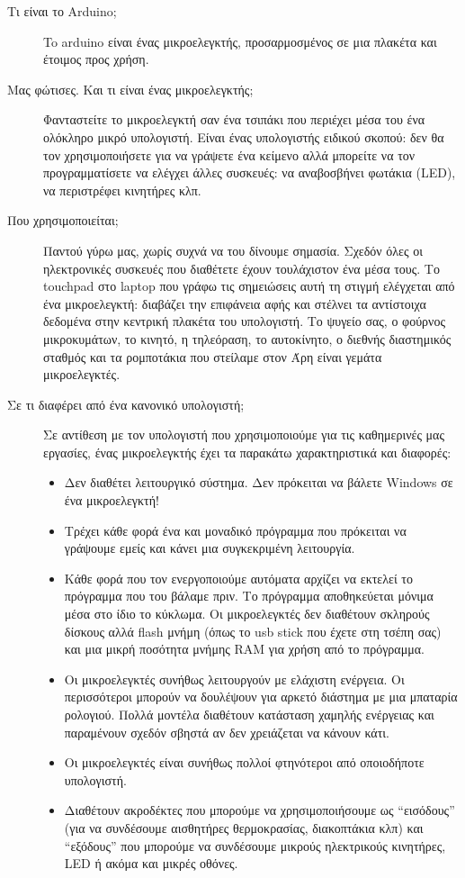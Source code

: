 \documentclass[a4paper,twoside,12pt]{article}
\begin{document}
\begin{description}

\item [Τι είναι το Arduino;]
To arduino είναι ένας μικροελεγκτής, προσαρμοσμένος σε μια πλακέτα και έτοιμος προς χρήση.
\item[Μας φώτισες. Και τι είναι ένας μικροελεγκτής;]
Φανταστείτε το μικροελεγκτή σαν ένα τσιπάκι που περιέχει μέσα του ένα ολόκληρο μικρό υπολογιστή. Είναι ένας υπολογιστής ειδικού σκοπού: δεν θα τον χρησιμοποιήσετε για να γράψετε ένα κείμενο αλλά μπορείτε να τον προγραμματίσετε να ελέγχει άλλες συσκευές: να αναβοσβήνει φωτάκια (LED), να περιστρέφει κινητήρες κλπ.
\item[Που χρησιμοποιείται;]
Παντού γύρω μας, χωρίς συχνά να του δίνουμε σημασία. Σχεδόν όλες οι ηλεκτρονικές συσκευές που διαθέτετε έχουν τουλάχιστον ένα μέσα τους. Το touchpad στο laptop που γράφω τις σημειώσεις αυτή τη στιγμή ελέγχεται από ένα μικροελεγκτή: διαβάζει την επιφάνεια αφής και στέλνει τα αντίστοιχα δεδομένα στην κεντρική πλακέτα του υπολογιστή. Το ψυγείο σας, ο φούρνος μικροκυμάτων, το κινητό, η τηλεόραση, το αυτοκίνητο, ο διεθνής διαστημικός σταθμός και τα ρομποτάκια που στείλαμε στον Άρη είναι γεμάτα μικροελεγκτές.
\item[Σε τι διαφέρει από ένα κανονικό υπολογιστή;]
Σε αντίθεση με τον υπολογιστή που χρησιμοποιούμε για τις καθημερινές μας εργασίες, ένας μικροελεγκτής έχει τα παρακάτω χαρακτηριστικά και διαφορές:
%
\begin{itemize}
\item Δεν διαθέτει λειτουργικό σύστημα. Δεν πρόκειται να βάλετε Windows σε ένα μικροελεγκτή!
\item Τρέχει κάθε φορά ένα και μοναδικό πρόγραμμα που πρόκειται να γράψουμε εμείς και κάνει μια συγκεκριμένη λειτουργία.
\item Κάθε φορά που τον ενεργοποιούμε αυτόματα αρχίζει να εκτελεί το πρόγραμμα που του βάλαμε πριν. Το πρόγραμμα αποθηκεύεται μόνιμα μέσα στο ίδιο το κύκλωμα. Οι μικροελεγκτές δεν διαθέτουν σκληρούς δίσκους αλλά flash μνήμη (όπως το usb stick που έχετε στη τσέπη σας) και μια μικρή ποσότητα μνήμης RAM για χρήση από το πρόγραμμα.
\item Οι μικροελεγκτές συνήθως λειτουργούν με ελάχιστη ενέργεια. Οι περισσότεροι μπορούν να δουλέψουν για αρκετό διάστημα με μια μπαταρία ρολογιού. Πολλά μοντέλα διαθέτουν κατάσταση χαμηλής ενέργειας και παραμένουν σχεδόν σβηστά αν δεν χρειάζεται να κάνουν κάτι.
\item Οι μικροελεγκτές είναι συνήθως πολλοί φτηνότεροι από οποιοδήποτε υπολογιστή.
\item Διαθέτουν ακροδέκτες που μπορούμε να χρησιμοποιήσουμε ως ``εισόδους'' (για να συνδέσουμε αισθητήρες θερμοκρασίας, διακοπτάκια κλπ) και ``εξόδους'' που μπορούμε να συνδέσουμε μικρούς ηλεκτρικούς κινητήρες, LED ή ακόμα και μικρές οθόνες.
\end{itemize}


\end{description}
\end{document}
